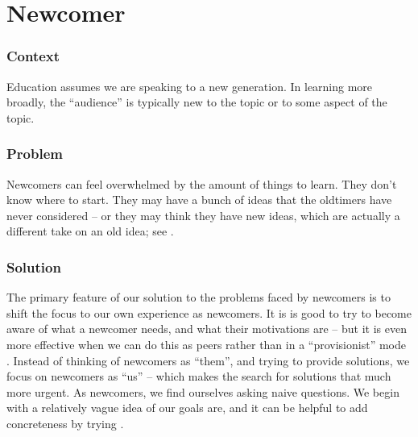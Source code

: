 

\section{Newcomer}\label{sec:Newcomer}

\subsubsection*{Context}
Education assumes we are speaking to a new generation. 
In learning more broadly, the ``audience'' is typically new to the topic or to some aspect of the topic.

\subsubsection*{Problem} Newcomers can feel overwhelmed by the amount of things to learn.  They
don't know where to start.  They may have a bunch of ideas that the
oldtimers have never considered -- or they may think they have new
ideas, which are actually a different take on an old idea; see
.

\subsubsection*{Solution}
The primary feature of our solution to the problems faced by newcomers
is to shift the focus to our own experience as newcomers.
It is is good to try to become aware of what a newcomer needs, and what their
motivations are -- but it is even more effective when we can do this as peers rather than
in a ``provisionist'' mode \cite{boud2005peer}.  Instead of
thinking of newcomers as ``them'', and trying to provide solutions, we focus
on newcomers as ``us'' -- which makes the search for solutions that much more urgent. 
As newcomers, we find ourselves asking naive questions.
We begin with a relatively vague idea of our goals are, 
and it can be helpful to add concreteness by trying .

%

